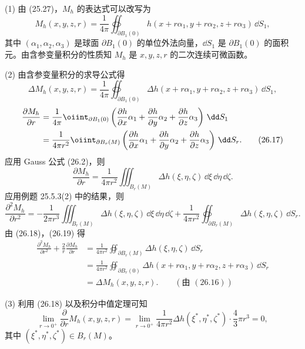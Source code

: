 \begin{xproof}
(1) 由 (25.27)，$M_h$ 的表达式可以改写为
\[
  M_h(x,y,z,r)=\frac{1}{4\pi}\oiint_{\partial B_1(0)}
  h(x+r\alpha_1,y+r\alpha_2,z+r\alpha_3)\,\dd S_1,
\]
其中 $(\alpha_1,\alpha_2,\alpha_3)$ 是球面 $\partial B_1(0)$ 的单位外法向量，$\dd S_1$ 是 $\partial B_1(0)$ 的面积元。由含参变量积分的性质知 $M_h$ 是 $x,y,z,r$ 的二次连续可微函数。

(2) 由含参变量积分的求导公式得
\begin{equation}
  \Delta M_h(x,y,z,r)
  =\frac{1}{4\pi}\oiint_{\partial B_1(0)}
  \Delta h(x+r\alpha_1,y+r\alpha_2,z+r\alpha_3)\,\dd S_1,
  \tag{26.16}
  \label{eq:26.16}
\end{equation}
\begin{align}
  \frac{\partial M_h}{\partial r}
  &=\frac{1}{4\pi}\oiint_{\partial B_1(0)}
  \left(\frac{\partial h}{\partial x}\alpha_1
  +\frac{\partial h}{\partial y}\alpha_2
  +\frac{\partial h}{\partial z}\alpha_3\right)\,\dd S_1\notag\\
  &=\frac{1}{4\pi r^2}\oiint_{\partial B_r(M)}
  \left(\frac{\partial h}{\partial x}\alpha_1
  +\frac{\partial h}{\partial y}\alpha_2
  +\frac{\partial h}{\partial z}\alpha_3\right)\,\dd S_r.
  \tag{26.17}
  \label{eq:26.17}
\end{align}
应用 Gauss 公式 (26.2)，则
\begin{equation}
  \frac{\partial M_h}{\partial r}
  =\frac{1}{4\pi r^2}\iiint_{B_r(M)}\Delta h(\xi,\eta,\zeta)\,\dd\xi\,\dd\eta\,\dd\zeta.
  \tag{26.18}
  \label{eq:26.18}
\end{equation}
应用例题 25.5.3(2) 中的结果，则
\begin{equation}
  \frac{\partial^2M_h}{\partial r^2}
  =-\frac{1}{2\pi r^3}\iiint_{B_r(M)}\Delta h(\xi,\eta,\zeta)\,\dd\xi\,\dd\eta\,\dd\zeta
  +\frac{1}{4\pi r^2}\oiint_{\partial B_r(M)}\Delta h(\xi,\eta,\zeta)\,\dd S_r.
  \tag{26.19}
  \label{eq:26.19}
\end{equation}
由 (26.18)，(26.19) 得
\begin{align*}
  \frac{\partial^2M_h}{\partial r^2}+\frac{2}{r}\frac{\partial M_h}{\partial r}
  &=\frac{1}{4\pi r^2}\oiint_{\partial B_r(M)}\Delta h(\xi,\eta,\zeta)\,\dd S_r\\
  &=\frac{1}{4\pi r^2}\oiint_{\partial B_r(0)}\Delta h(x+r\alpha_1,y+r\alpha_2,z+r\alpha_3)\,\dd S_r\\
  &=\Delta M_h(x,y,z,r).\qquad(\text{由 }(26.16))
\end{align*}

(3) 利用 (26.18) 以及积分中值定理可知
\[
  \lim_{r\to0^+}\frac{\partial}{\partial r}M_h(x,y,z,r)
  =\lim_{r\to0^+}\frac{1}{4\pi r^2}\Delta h(\xi^*,\eta^*,\zeta^*)\cdot\frac{4}{3}\pi r^3=0,
\]
其中 $(\xi^*,\eta^*,\zeta^*)\in B_r(M)$。
\end{xproof}

